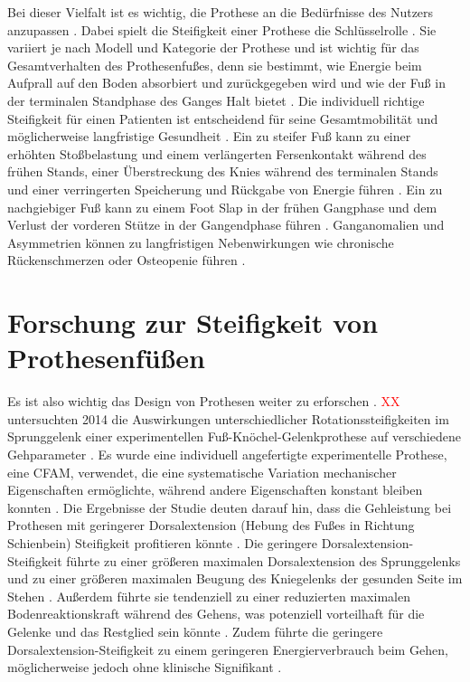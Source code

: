 Bei dieser Vielfalt ist es wichtig, die Prothese an die Bedürfnisse des Nutzers anzupassen \cite{Stevens.2018}. Dabei spielt die Steifigkeit einer Prothese die Schlüsselrolle \cite{Shepherd.2020}. 
Sie variiert je nach Modell und Kategorie der Prothese und ist wichtig für das Gesamtverhalten des Prothesenfußes, denn sie bestimmt, wie Energie beim Aufprall auf den Boden absorbiert und zurückgegeben wird und wie der Fuß in der terminalen Standphase des Ganges Halt bietet \cite{Shepherd.2020}. Die individuell richtige Steifigkeit für einen Patienten ist entscheidend für seine Gesamtmobilität und möglicherweise langfristige Gesundheit \cite{Shepherd.2020}. 
Ein zu steifer Fuß kann zu einer erhöhten Stoßbelastung und einem verlängerten Fersenkontakt während des frühen Stands, einer Überstreckung des Knies während des terminalen Stands und einer verringerten Speicherung und Rückgabe von Energie führen \cite{Shepherd.2020}. 
Ein zu nachgiebiger Fuß kann zu einem Foot Slap in der frühen Gangphase und dem Verlust der vorderen Stütze in der Gangendphase führen \cite{Shepherd.2020}. 
Ganganomalien und Asymmetrien können zu langfristigen Nebenwirkungen wie chronische Rückenschmerzen oder Osteopenie führen \cite{Shepherd.2020}. \\

\section{Forschung zur Steifigkeit von Prothesenfüßen} 
Es ist also wichtig das Design von Prothesen weiter zu erforschen \cite{Major.2014}. \textcolor{red}{XX} untersuchten 2014 die Auswirkungen unterschiedlicher Rotationssteifigkeiten im Sprunggelenk einer experimentellen Fuß-Knöchel-Gelenkprothese auf verschiedene Gehparameter \cite{Major.2014}.  %
Es wurde eine individuell angefertigte experimentelle Prothese, eine CFAM, verwendet, die eine systematische Variation mechanischer Eigenschaften ermöglichte, während andere Eigenschaften konstant bleiben konnten \cite{Major.2014}. 
Die Ergebnisse der Studie deuten darauf hin, dass die Gehleistung bei Prothesen mit geringerer Dorsalextension (Hebung des Fußes in Richtung Schienbein) Steifigkeit profitieren könnte \cite{Major.2014}. %
Die geringere Dorsalextension-Steifigkeit führte zu einer größeren maximalen Dorsalextension des Sprunggelenks und zu einer größeren maximalen Beugung des Kniegelenks der gesunden Seite im Stehen \cite{Major.2014}. Außerdem führte sie tendenziell zu einer reduzierten maximalen Bodenreaktionskraft während des Gehens, was potenziell vorteilhaft für die Gelenke und das Restglied sein könnte \cite{Major.2014}.  Zudem führte die geringere Dorsalextension-Steifigkeit zu einem geringeren Energierverbrauch beim Gehen, möglicherweise jedoch ohne klinische Signifikant \cite{Major.2014}.

